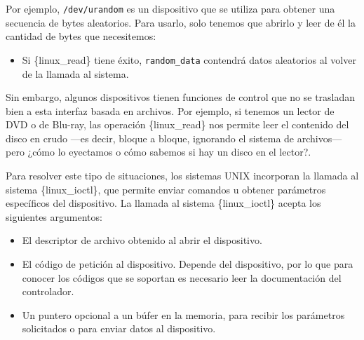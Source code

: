 Por ejemplo, \texttt{/dev/urandom} es un dispositivo que se utiliza para
obtener una secuencia de bytes aleatorios. Para usarlo, solo tenemos que
abrirlo y leer de él la cantidad de bytes que necesitemos:

\begin{Shaded}
\begin{Highlighting}[]
\OperatorTok{=}\OperatorTok{(} \OperatorTok{,}\OperatorTok{);}
 \OperatorTok{(}\OperatorTok{\textgreater{}=} \OperatorTok{)} \OperatorTok{\{}
    \OperatorTok{[}\OperatorTok{];}
    \OperatorTok{=}\OperatorTok{(}\OperatorTok{,}\OperatorTok{,} \OperatorTok{(}\OperatorTok{)} \OperatorTok{);}


\OperatorTok{(}\OperatorTok{);}
\OperatorTok{\}}
\end{Highlighting}
\end{Shaded}

\begin{itemize}
\item
  Si \{linux\_read\} tiene éxito, \texttt{random\_data} contendrá datos
  aleatorios al volver de la llamada al sistema.
\end{itemize}

Sin embargo, algunos dispositivos tienen funciones de control que no se
trasladan bien a esta interfaz basada en archivos. Por ejemplo, si
tenemos un lector de DVD o de Blu-ray, las operación \{linux\_read\} nos
permite leer el contenido del disco en crudo ---es decir, bloque a
bloque, ignorando el sistema de archivos--- pero ¿cómo lo eyectamos o
cómo sabemos si hay un disco en el lector?.

Para resolver este tipo de situaciones, los sistemas UNIX incorporan la
llamada al sistema \{linux\_ioctl\}, que permite enviar comandos u
obtener parámetros específicos del dispositivo. La llamada al sistema
\{linux\_ioctl\} acepta los siguientes argumentos:

\begin{itemize}
\item
  El descriptor de archivo obtenido al abrir el dispositivo.
\item
  El código de petición al dispositivo. Depende del dispositivo, por lo
  que para conocer los códigos que se soportan es necesario leer la
  documentación del controlador.
\item
  Un puntero opcional a un búfer en la memoria, para recibir los
  parámetros solicitados o para enviar datos al dispositivo.
\end{itemize}

